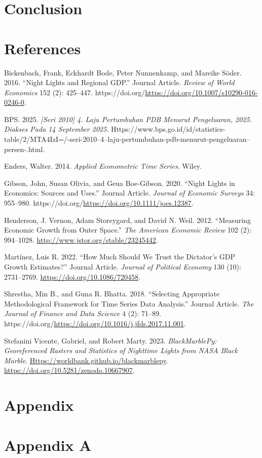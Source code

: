 \documentclass[
]{interact}
\newlength{\cslhangindent}
\newenvironment{CSLReferences}[2] %
 {\begin{list}{}{%
  \setlength{\itemindent}{0pt}
  \setlength{\leftmargin}{0pt}
  \setlength{\parsep}{0pt}
  \ifodd #1
   \setlength{\leftmargin}{\cslhangindent}
   \setlength{\itemindent}{-1\cslhangindent}
  \fi
  \setlength{\itemsep}{#2\baselineskip}}}
 {\end{list}}
\begin{document}
\section{Conclusion}\label{conclusion}

\section*{References}\label{references}

\label{refs}
\begin{CSLReferences}{1}{1}
Bickenbach, Frank, Eckhardt Bode, Peter Nunnenkamp, and Mareike Söder.
2016. {``Night Lights and Regional GDP.''} Journal Article. \emph{Review
of World Economics} 152 (2): 425--447.
https://doi.org/\url{https://doi.org/10.1007/s10290-016-0246-0}.

BPS. 2025. \emph{{[}Seri 2010{]} 4. Laju Pertumbuhan PDB Menurut
Pengeluaran, 2025. Diakses Pada 14 September 2025}.
Https://www.bps.go.id/id/statistics-table/2/MTA4IzI=/-seri-2010--4--laju-pertumbuhan-pdb-menurut-pengeluaran--persen-.html.

Enders, Walter. 2014. \emph{Applied Econometric Time Series}. Wiley.

Gibson, John, Susan Olivia, and Geua Boe-Gibson. 2020. {``Night Lights
in Economics: Sources and Uses.''} Journal Article. \emph{Journal of
Economic Surveys} 34: 955--980.
https://doi.org/\url{https://doi.org/10.1111/joes.12387}.

Henderson, J. Vernon, Adam Storeygard, and David N. Weil. 2012.
{``Measuring Economic Growth from Outer Space.''} \emph{The American
Economic Review} 102 (2): 994--1028.
\url{http://www.jstor.org/stable/23245442}.

Martínez, Luis R. 2022. {``How Much Should We Trust the Dictator's GDP
Growth Estimates?''} Journal Article. \emph{Journal of Political
Economy} 130 (10): 2731--2769. \url{https://doi.org/10.1086/720458}.

Shrestha, Min B., and Guna R. Bhatta. 2018. {``Selecting Appropriate
Methodological Framework for Time Series Data Analysis.''} Journal
Article. \emph{The Journal of Finance and Data Science} 4 (2): 71--89.
https://doi.org/\url{https://doi.org/10.1016/j.jfds.2017.11.001}.

Stefanini Vicente, Gabriel, and Robert Marty. 2023.
\emph{{BlackMarblePy: Georeferenced Rasters and Statistics of Nighttime
Lights from NASA Black Marble}}.
\href{https://worldbank.github.io/blackmarblepy}{Https://worldbank.github.io/blackmarblepy}.
\url{https://doi.org/10.5281/zenodo.10667907}.

\end{CSLReferences}

\section{Appendix}\label{appendix}

\section*{Appendix A}\label{appendix-a}
\end{document}
